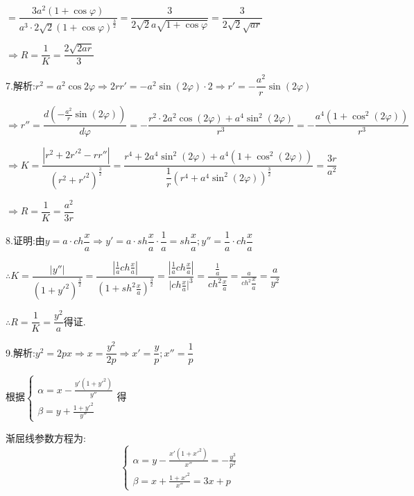 $ = \dfrac{{3{a^2}(1 + \cos \varphi )}}{{{a^3} \cdot 2\sqrt 2 {{(1 + \cos \varphi )}^{\frac{3}{2}}}}} = \dfrac{3}{{2\sqrt 2 a\sqrt {1 + \cos \varphi } }} = \dfrac{3}{{2\sqrt 2 \sqrt {ar} }}$

$ \Rightarrow R = \dfrac{1}{K} = \dfrac{{2\sqrt {2ar} }}{3}$

7.解析:${r^2} = {a^2}\cos 2\varphi  \Rightarrow 2rr' =  - {a^2}\sin (2\varphi ) \cdot 2 \Rightarrow r' =  - \dfrac{{{a^2}}}{r}\sin (2\varphi )$

$ \Rightarrow r'' = \dfrac{{d( - \frac{{{a^2}}}{r}\sin (2\varphi ))}}{{d\varphi }} =  - \dfrac{{{r^2} \cdot 2{a^2}\cos (2\varphi ) + {a^4}{{\sin }^2}(2\varphi )}}{{{r^3}}} =  - \dfrac{{{a^4}(1 + {{\cos }^2}(2\varphi ))}}{{{r^3}}}$

$ \Rightarrow K = \dfrac{{|{r^2} + 2{{r'}^2} - rr''|}}{{{{({r^2} + {{r'}^2})}^{\frac{3}{2}}}}} = \dfrac{{{r^4} + 2{a^4}{{\sin }^2}(2\varphi ) + {a^4}(1 + {{\cos }^2}(2\varphi ))}}{{\dfrac{1}{r}{{({r^4} + {a^4}{{\sin }^2}(2\varphi ))}^{\frac{3}{2}}}}} = \dfrac{{3r}}{{{a^2}}}$

$ \Rightarrow R = \dfrac{1}{K} = \dfrac{{{a^2}}}{{3r}}$

8.证明:由$y = a \cdot ch\dfrac{x}{a} \Rightarrow y' = a \cdot sh\dfrac{x}{a} \cdot \dfrac{1}{a} = sh\dfrac{x}{a};y'' = \dfrac{1}{a} \cdot ch\dfrac{x}{a}$

$\therefore K = \dfrac{{|y''|}}{{{{(1 + {{y'}^2})}^{\frac{3}{2}}}}} = \dfrac{{|\frac{1}{a}ch\frac{x}{a}|}}{{{{(1 + s{h^2}\frac{x}{a})}^{\frac{3}{2}}}}} = \dfrac{{|\frac{1}{a}ch\frac{x}{a}|}}{{|ch\frac{x}{a}{|^3}}} = \dfrac{{\frac{1}{a}}}{{c{h^2}\frac{x}{a}}} = \frac{a}{{c{h^2}\dfrac{x}{a}}} = \dfrac{a}{{{y^2}}}$

$\therefore R = \dfrac{1}{K} = \dfrac{{{y^2}}}{a}$得证.

9.解析:${y^2} = 2px \Rightarrow x = \dfrac{{{y^2}}}{{2p}} \Rightarrow x' = \dfrac{y}{p};x'' = \dfrac{1}{p}$

根据$\left\{ \begin{array}{l}
\alpha  = x - \frac{{y'(1 + {{y'}^2})}}{{y''}}\\
\beta  = y + \frac{{1 + {{y'}^2}}}{{y''}}
\end{array} \right.$得

渐屈线参数方程为:\[\left\{ \begin{array}{l}
\alpha  = y - \frac{{x'(1 + {{x'}^2})}}{{x''}} =  - \frac{{{y^3}}}{{{p^2}}}\\
\beta  = x + \frac{{1 + {{x'}^2}}}{{x''}} = 3x + p
\end{array} \right.\]

